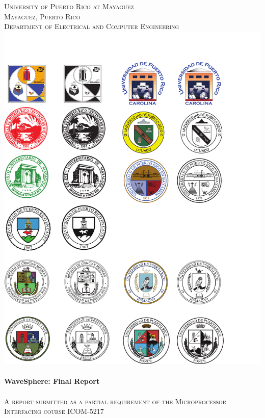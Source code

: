\begin{titlepage}

\begin{center}


    

\textsc{\large University of Puerto Rico at Mayag\"{u}ez}\\[0.5cm]
\textsc{\large Mayag\"{u}ez, Puerto Rico}\\[0.5cm]
\textsc{\normalsize Department of Electrical and Computer Engineering}\\[1.5cm]
\includegraphics[scale=1.25]{res/logo_rum}\\[1cm]


\HRule \\[0.5cm]
{ \huge \bfseries WaveSphere: Final Report}\\[0.2cm]
\HRule \\[0.5cm]
\textsc{A report submitted as a partial requirement of the Microprocessor Interfacing course ICOM-5217}\\[0.5cm]


\end{center}
\end{titlepage}

